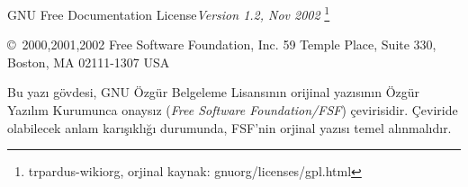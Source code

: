 
{\Large GNU Free Documentation License\itshape Version 1.2, Nov 2002}\label{gfdl}
\footnote{tr\centerdot pardus-wiki\centerdot org, orjinal kaynak: gnu\centerdot org/licenses/gpl.html}

\noindent\footnotesize\copyright\ 2000,2001,2002  Free Software Foundation, Inc. 59 Temple Place, Suite 330, Boston, MA  02111-1307 USA

\noindent Bu yazı gövdesi, GNU Özgür Belgeleme Lisansının orijinal yazısının Özgür Yazılım Kurumunca onaysız (\emph{Free Software Foundation/FSF}) çevirisidir. Çeviride olabilecek anlam karışıklığı durumunda, FSF'nin orjinal yazısı temel alınmalıdır. 

\newenvironment{ingliz}%
{\vspace{2pt}\noindent
  \Termes\it\footnotesize%
}%

{
\ignorespacesafterend\vspace{\baselineskip}
}

\newenvironment{turkis}%
{
  \par\vspace{\baselineskip}\noindent
  \Termes\it\footnotesize%
}%

{
\ignorespacesafterend\vspace{\baselineskip}
}

\def\lisansstil{\renewcommand{\thesubsection}{\thechapter.\arabic{subsection}}\let\section\subsection\setcounter{subsection}{-1}\multicolsep=1.5pc}

